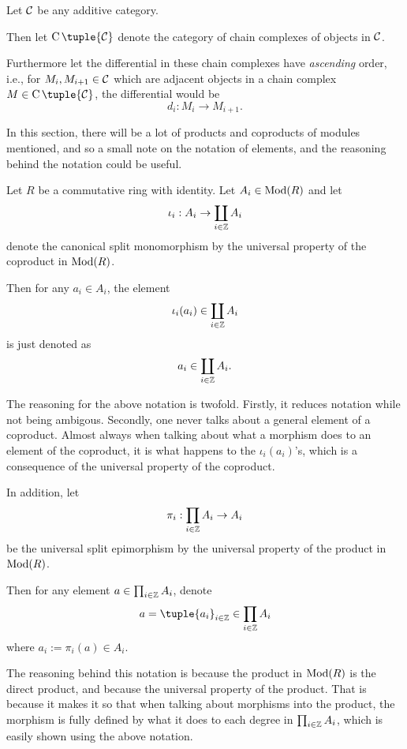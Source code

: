 \begin{notation}
    Let \( {\mathcal{C}} \) be any additive category.
    
    Then let \( \C \tuple{\Cc} \) denote the category of chain complexes of objects in \( {\mathcal{C}} \).

    Furthermore let the differential in these chain complexes have \emph{ascending} order, i.e., for \( M_i, M_{i+1} \in {\mathcal{C}} \) which are adjacent objects in a chain complex \( M \in \C \tuple{\Cc} \), the differential would be
    \[
        d_i : M_i \to M_{i + 1}.
    \]
\end{notation}

\begin{notation}
    In this section, there will be a lot of products and coproducts of modules mentioned, and so a small note on the notation of elements, and the reasoning behind the notation could be useful.

    Let \( R \) be a commutative ring with identity. Let \( A_i \in \operatorname{Mod}(R) \) and let
    \[
        \iota_i: A_i \to \coprod_{i \in {\mathbb{Z}}} A_i
    \]
    denote the canonical split monomorphism by the universal property of the coproduct in \( \operatorname{Mod}(R) \).

    Then for any \( a_i \in A_i \), the element
    \[
        \iota_i(a_i) \in \coprod_{i \in {\mathbb{Z}}} A_i
    \]
    is just denoted as
    \[
        a_i \in \coprod_{i \in {\mathbb{Z}}} A_i.
    \]
    
    The reasoning for the above notation is twofold. Firstly, it reduces notation while not being ambigous. Secondly, one never talks about a general element of a coproduct. Almost always when talking about what a morphism does to an element of the coproduct, it is what happens to the \( \iota_i(a_i) \)'s, which is a consequence of the universal property of the coproduct.

    In addition, let 
    \[
        \pi_i: \prod_{i \in {\mathbb{Z}}} A_i \to A_i
    \]
    be the universal split epimorphism by the universal property of the product in \( \operatorname{Mod}(R) \).
    
    Then for any element \( a \in \prod_{i \in {\mathbb{Z}}} A_i \), denote
    \[
        a = \tuple{a_i}_{i \in \Zb} \in \prod_{i \in \Zb} A_i
    \]
    where \( a_i := \pi_i(a) \in A_i \).
    
    The reasoning behind this notation is because the product in \( \operatorname{Mod}(R) \) is the direct product, and because the universal property of the product. That is because it makes it so that when talking about morphisms into the product, the morphism is fully defined by what it does to each degree in \( \prod_{i \in {\mathbb{Z}}} A_i \), which is easily shown using the above notation.  
\end{notation}

